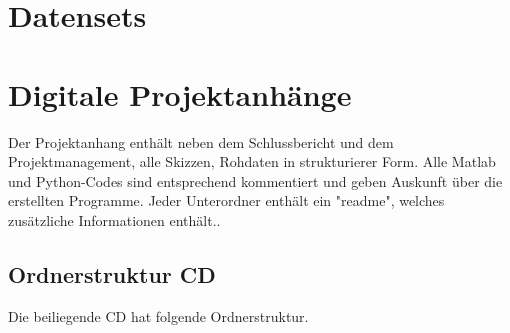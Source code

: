 \appendix

\chapter{Datensets}

\chapter{Digitale Projektanhänge}
\label{Anhang}

Der Projektanhang enthält neben dem Schlussbericht und dem Projektmanagement, alle Skizzen, Rohdaten in strukturierer Form. Alle Matlab und Python-Codes sind entsprechend kommentiert und geben Auskunft über die erstellten Programme. Jeder Unterordner enthält ein "readme", welches zusätzliche Informationen enthält..
\section{Ordnerstruktur CD}

Die beiliegende CD hat folgende Ordnerstruktur.

